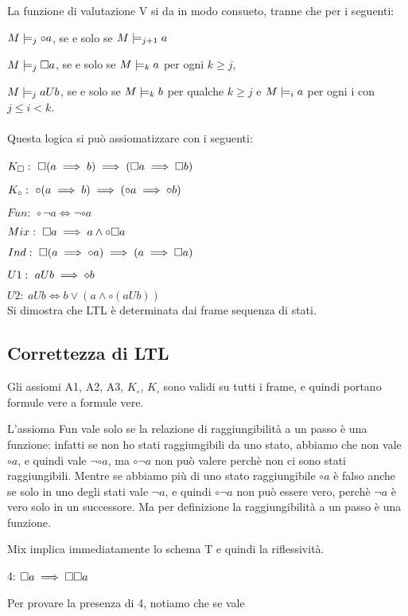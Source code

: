 La funzione di valutazione V si da in modo consueto, tranne che per
i seguenti:

$M\models_{j}\circ a$, se e solo se $M\models_{j+1}a$

$M\models_{j}\square a$, se e solo se $M\models_{k}a$ per ogni $k\geq j$,

$M\models_{j}aUb$, se e solo se $M\models_{k}b$ per qualche $k\geq j$
e $M\models_{i}a$ per ogni i con$j\leq i<k$.\\
\\
Questa logica si può assiomatizzare con i seguenti:\\
\\
$K_{\square}:\ \square(a\implies b)\implies(\square a\implies\square b)$

$K_{\circ}:\ \circ(a\implies b)\implies(\circ a\implies\circ b)$

$Fun:\ \circ\neg a\iff\neg\circ a$

$Mix:\ \square a\implies a\wedge\circ\square a$

$Ind:\ \square(a\implies\circ a)\implies(a\implies\square a)$

$U1:\ aUb\implies\diamond b$

$U2:\ aUb\iff b\vee(a\wedge\circ(aUb))$\\


Si dimostra che LTL è determinata dai frame sequenza di stati.


\subsection{Correttezza di LTL}

Gli assiomi A1, A2, A3, $K_{\circ}$, $K_{\square}$ sono validi su
tutti i frame, e quindi portano formule vere a formule vere.

L'assioma Fun vale solo se la relazione di raggiungibilità a un passo
è una funzione: infatti se non ho stati raggiungibili da uno stato,
abbiamo che non vale $\circ a$, e quindi vale $\neg\circ a$, ma
$\circ\neg a$ non può valere perchè non ci sono stati raggiungibili.
Mentre se abbiamo più di uno stato raggiungibile $\circ a$ è falso
anche se solo in uno degli stati vale $\neg a$, e quindi $\circ\neg a$
non può essere vero, perchè $\neg a$ è vero solo in un successore.
Ma per definizione la raggiungibilità a un passo è una funzione.

Mix implica immediatamente lo schema T e quindi la riflessività.

4: $\square a\implies\square\square a$

Per provare la presenza di 4, notiamo che se vale 

